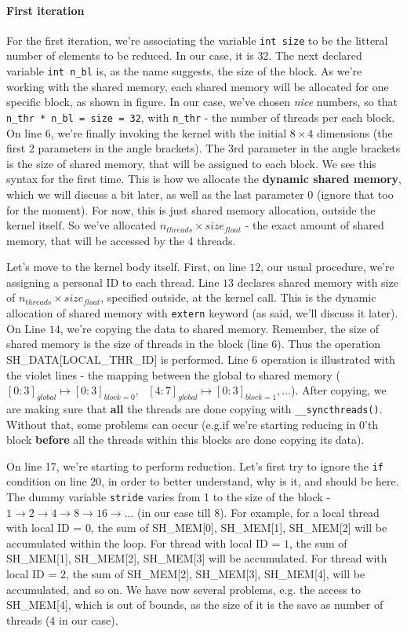 \paragraph*{First iteration}
For the first iteration, we're associating the variable \verb|int size| to be the litteral 
number of elements to be reduced. In our case, it is $32$. The next declared variable \verb|int n_bl| is, 
as the name suggests, the size of the block. As we're working with the shared memory, each shared memory 
will be allocated for one specific block, as shown in figure. In our case, we've chosen \textit{nice} 
numbers, so that \verb|n_thr * n_bl = size = 32|, with \verb|n_thr| - the number of threads per each block.
On line $6$, we're finally invoking the kernel with the initial $8\times 4$ dimensions (the first 2 parameters in the angle brackets). 
The 3rd parameter in the angle brackets is the size of shared memory, that will be assigned to each block. 
We see this syntax for the first time. This is how we allocate the \textbf{dynamic shared memory}, which we will 
discuss a bit later, as well as the last parameter $0$ (ignore that too for the moment).
For now, this is just shared memory allocation, outside the kernel itself. So we've allocated 
$n_{threads}\times size_{float}$ - the exact amount of shared memory, that will be accessed by the 4 threads. 

Let's move to the kernel body itself. First, on line $12$, our usual procedure, we're assigning a personal 
ID to each thread. Line $13$ declares shared memory with size of $n_{threads}\times size_{float}$, specified outside, 
at the kernel call. This is the dynamic allocation of shared memory with \verb|extern| keyword 
(as said, we'll discuss it later). On Line $14$, we're copying the data to shared memory. Remember, 
the size of shared memory is the size of threads in the block (line $6$). Thus the operation 
SH\_DATA[LOCAL\_THR\_ID] is performed. Line $6$ operation is illustrated with the violet lines - the
mapping between the global to shared memory ($[0:3]_{global}\mapsto [0:3]_{block=0},\text{ } [4:7]_{global}\mapsto [0:3]_{block=1}, \text{...} $).
After copying, we are making sure that \textbf{all} the threads are done copying with \verb|__syncthreads()|. Without that, some problems can occur 
(e.g.if we're starting reducing in 0'th block \textbf{before} all the threads within this blocks are done copying its data).

On line 17, we're starting to perform reduction. Let's first try to ignore the \verb|if| 
condition on line $20$, in order to better understand, why is it, and should be here. The 
dummy variable \verb|stride| varies from 1 to the size of the block -
$1\to 2\to 4\to 8\to 16 \to ...$ (in our case till $8$).%
For example, for a local thread with local ID = $0$, the sum of SH\_MEM[0], SH\_MEM[1], SH\_MEM[2] will be accumulated 
within the loop. For thread with local ID = $1$, the sum of SH\_MEM[1], SH\_MEM[2], SH\_MEM[3] will be accumulated. For
thread with local ID = $2$, the sum of SH\_MEM[2], SH\_MEM[3], SH\_MEM[4], will be accumulated, and so on. 
We have now several problems, e.g. the access to SH\_MEM[4], which is out of bounds, as the size of it is the 
save as number of threads ($4$ in our case). 

